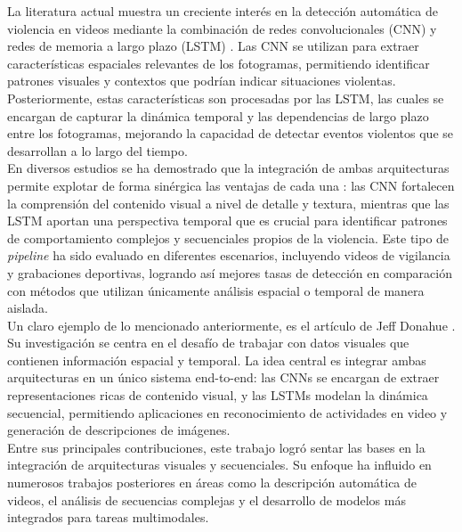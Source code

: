 La literatura actual muestra un creciente interés en la 
detección automática de violencia en videos mediante la 
combinación de redes convolucionales (CNN) y redes de 
memoria a largo plazo (LSTM) \cite{sudhakaran2017learning}. 
Las CNN se utilizan para extraer características espaciales 
relevantes de los fotogramas, permitiendo identificar 
patrones visuales y contextos que podrían indicar situaciones 
violentas. Posteriormente, estas características son procesadas 
por las LSTM, las cuales se encargan de capturar la dinámica 
temporal y las dependencias de largo plazo entre los 
fotogramas, mejorando la capacidad de detectar eventos 
violentos que se desarrollan a lo largo del tiempo.\\

En diversos estudios se ha demostrado que la integración 
de ambas arquitecturas permite explotar de forma sinérgica 
las ventajas de cada una \cite{mohammadi2022cnn}: las CNN fortalecen la comprensión 
del contenido visual a nivel de detalle y textura, mientras 
que las LSTM aportan una perspectiva temporal que es crucial 
para identificar patrones de comportamiento complejos y 
secuenciales propios de la violencia. Este tipo de 
\textit{pipeline} ha sido evaluado en diferentes escenarios, 
incluyendo videos de vigilancia y grabaciones deportivas, 
logrando así mejores tasas de detección en comparación con 
métodos que utilizan únicamente análisis espacial o temporal 
de manera aislada.\\

Un claro ejemplo de lo mencionado anteriormente, 
es el artículo de Jeff Donahue
\cite{Donahue2016}. Su investigación se centra en el 
desafío de trabajar con datos visuales que contienen 
información espacial y temporal. La idea central es 
integrar ambas arquitecturas en un único sistema 
end-to-end: las CNNs se encargan de extraer 
representaciones ricas de contenido visual, y las 
LSTMs modelan la dinámica secuencial, permitiendo 
aplicaciones en reconocimiento de actividades en video y 
generación de descripciones de imágenes. \\

Entre sus principales contribuciones, este trabajo 
logró sentar las bases en la integración de 
arquitecturas visuales y secuenciales. Su enfoque ha 
influido en numerosos trabajos posteriores en áreas como 
la descripción automática de videos, el análisis de 
secuencias complejas y el desarrollo de modelos más 
integrados para tareas multimodales.\\

